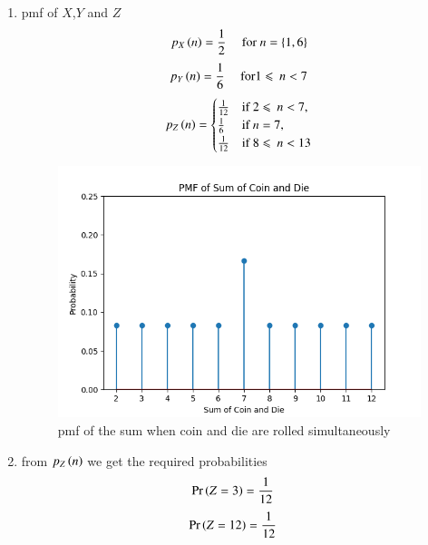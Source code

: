 \documentclass[journal,12pt,onecolumn]{IEEEtran}
\begin{document}
\begin{enumerate}[label=(\alph*)]
		 \item pmf of $X$,$Y$ and $Z$
			 \begin{align}
				 p_X\left(n\right) &= \frac{1}{2} & \text{ for $n = \{1,6\}$} 
			 \end{align}
			 \begin{align}
				 p_Y\left(n\right) &= \frac{1}{6} & \text{ for} 1 \leqslant\: n < 7
			 \end{align}
			 \begin{align}
				 p_Z\left(n\right) = \begin{cases} \frac{1}{12} & \text{if } 2 \leqslant\: n < 7 , \\ \frac{1}{6} & \text{if $n = 7$,} \\ \frac{1}{12} & \text{if } 8 \leqslant\: n < 13 \end{cases}
			 \end{align}
			 \begin{figure}[h]
				 \centering
				 \includegraphics[width=\columnwidth]{1.png}
				 \caption{pmf of the sum when coin and die are rolled simultaneously}
				 \label{fig:pmf}
			 \end{figure}

		 \item from $p_Z\left(n\right)$ we get the required probabilities 
	   \begin{align}
		   \Pr\left(Z = 3\right) &= \frac{1}{12}
	      \end{align}      
              \begin{align}
		      \Pr\left(Z = 12\right) &= \frac{1}{12}
	      \end{align}
 \end{enumerate} 
 
\end{document}
